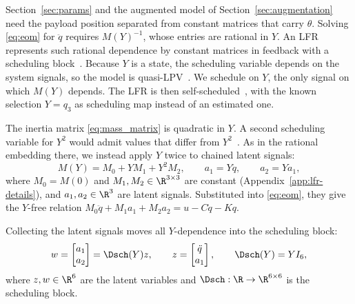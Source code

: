 Section~\ref{sec:params} and the augmented model of
Section~\ref{sec:augmentation} need the payload position separated from
constant matrices that carry $\theta$.
Solving \eqref{eq:eom} for $\ddot q$ requires $M(Y)^{-1}$, whose entries are
rational in $Y$.
An LFR represents such rational dependence by constant matrices in feedback
with a scheduling block~\cite[Sec.~3.1]{drenth2025lpvlfr}.
Because $Y$ is a state, the scheduling variable depends on the system signals,
so the model is quasi-LPV~\cite[Sec.~7.3, Def.~7.2]{toth2010modeling}.
We schedule on $Y$, the only signal on which $M(Y)$ depends.
The LFR is then self-scheduled~\cite[Sec.~3.2]{drenth2025lpvlfr}, with the
known selection $Y=q_3$ as scheduling map instead of an estimated one.

The inertia matrix \eqref{eq:mass_matrix} is quadratic in $Y$.
A second scheduling variable for $Y^2$ would admit values that differ from
$Y^2$~\cite[Sec.~2.1.1]{drenth2025thesis}.
As in the rational embedding there, we instead apply $Y$ twice to chained
latent signals:
\begin{equation}
  M(Y)=M_0+YM_1+Y^2M_2,\qquad a_1=Y\ddot q,\qquad a_2=Ya_1,
  \label{eq:Msplit}
\end{equation}
where $M_0=M(0)$ and $M_1,M_2\in\R^{3\times3}$ are constant
(Appendix~\ref{app:lfr-details}), and $a_1,a_2\in\R^3$ are latent signals.
Substituted into \eqref{eq:eom}, they give the $Y$-free relation
$M_0\ddot q+M_1a_1+M_2a_2=u-C\dot q-Kq$.

Collecting the latent signals moves all $Y$-dependence into the scheduling
block:
\begin{equation}
  w=\begin{bmatrix}a_1\\a_2\end{bmatrix}=\Dsch(Y)z,
  \qquad
  z=\begin{bmatrix}\ddot q\\a_1\end{bmatrix},
  \qquad
  \Dsch(Y)=YI_6,
  \label{eq:delta}
\end{equation}
where $z,w\in\R^6$ are the latent variables and
$\Dsch:\R\to\R^{6\times6}$ is the scheduling block.

